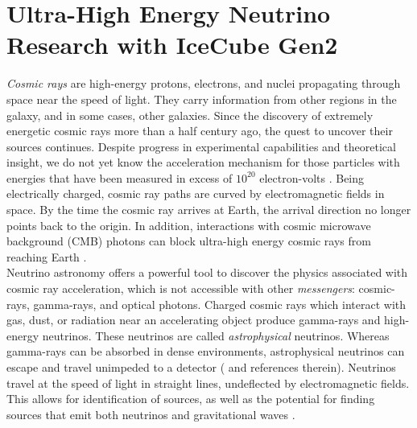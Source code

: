 \documentclass[../../../main.tex]{subfiles}
\begin{document}
\section{Ultra-High Energy Neutrino Research with IceCube Gen2}
\label{sec:neutrino}

\textit{Cosmic rays} are high-energy protons, electrons, and nuclei propagating through space near the speed of light.  They carry information from other regions in the galaxy, and in some cases, other galaxies.  Since the discovery of extremely energetic cosmic rays more than a half century ago, the quest to uncover their sources continues.  Despite progress in experimental capabilities and theoretical insight, we do not yet know the acceleration mechanism for those particles with energies that have been measured in excess of $10^{20}$ electron-volts \cite{10.1088/1742-6596/1766/1/012002}.  Being electrically charged, cosmic ray paths are curved by electromagnetic fields in space.  By the time the cosmic ray arrives at Earth, the arrival direction no longer points back to the origin.  In addition, interactions with cosmic microwave background (CMB) photons can block ultra-high energy cosmic rays from reaching Earth \cite{PhysRevLett.16.748} \cite{1966JETPL...4...78Z}.
\\
\vspace{0.15cm}
Neutrino astronomy offers a powerful tool to discover the physics associated with cosmic ray acceleration, which is not accessible with other \textit{messengers}: cosmic-rays, gamma-rays, and  optical photons. Charged cosmic rays which interact with gas, dust, or radiation near an accelerating object produce gamma-rays and high-energy neutrinos.  These neutrinos are called \textit{astrophysical} neutrinos. Whereas gamma-rays can be absorbed in dense environments, astrophysical neutrinos can escape and travel unimpeded to a detector (\cite{Astro2020_1} and references therein). Neutrinos travel at the speed of light in straight lines, undeflected by electromagnetic fields.  This allows for identification of sources, as well as the potential for finding sources that emit both neutrinos and gravitational waves \cite{10.3847/2041-8213/ab9d24}.
\\
\vspace{0.15cm}
\end{document}
